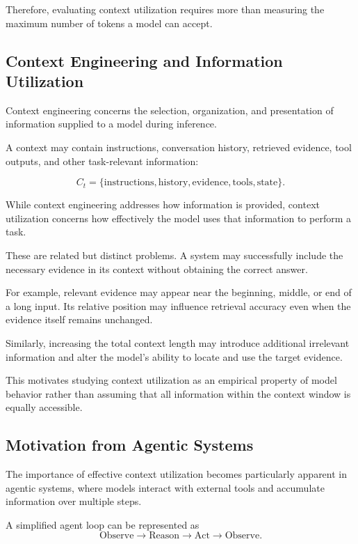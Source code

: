 Therefore, evaluating context utilization requires more than measuring the
maximum number of tokens a model can accept.

\subsection{Context Engineering and Information Utilization}

Context engineering concerns the selection, organization, and presentation of
information supplied to a model during inference.

A context may contain instructions, conversation history, retrieved evidence,
tool outputs, and other task-relevant information:

\[
    C_t =
    \{
        \text{instructions},
        \text{history},
        \text{evidence},
        \text{tools},
        \text{state}
    \}.
\]

While context engineering addresses how information is provided, context
utilization concerns how effectively the model uses that information to perform
a task.

These are related but distinct problems. A system may successfully include the
necessary evidence in its context without obtaining the correct answer.

For example, relevant evidence may appear near the beginning, middle, or end of
a long input. Its relative position may influence retrieval accuracy even when
the evidence itself remains unchanged.

Similarly, increasing the total context length may introduce additional
irrelevant information and alter the model's ability to locate and use the
target evidence.

This motivates studying context utilization as an empirical property of model
behavior rather than assuming that all information within the context window is
equally accessible.

\subsection{Motivation from Agentic Systems}

The importance of effective context utilization becomes particularly apparent
in agentic systems, where models interact with external tools and accumulate
information over multiple steps.

A simplified agent loop can be represented as
\[
    \text{Observe}
    \rightarrow
    \text{Reason}
    \rightarrow
    \text{Act}
    \rightarrow
    \text{Observe}.
\]

